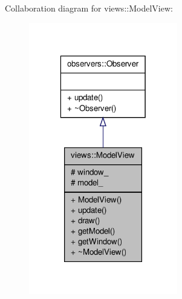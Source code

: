 \-Collaboration diagram for views\-:\-:\-Model\-View\-:\nopagebreak
\begin{figure}[H]
\begin{center}
\leavevmode
\includegraphics[width=184pt]{d1/da0/classviews_1_1ModelView__coll__graph}
\end{center}
\end{figure}
